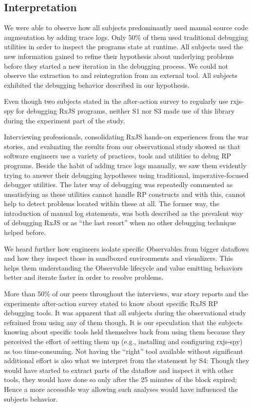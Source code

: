 \documentclass[sigplan,screen,review]{acmart}
\begin{document}
\subsection{Interpretation}

We were able to observe how all subjects predominantly used manual source code augmentation by adding trace logs. Only 50\% of them used traditional debugging utilities in order to inspect the programs state at runtime. All subjects used the new information gained to refine their hypothesis about underlying problems before they started a new iteration in the debugging process. We could not observe the extraction to and reintegration from an external tool. All subjects exhibited the debugging behavior described in our hypothesis.

Even though two subjects stated in the after-action survey to regularly use rxjs-spy for debugging RxJS programs, neither S1 nor S3 made use of this library during the experiment part of the study.

Interviewing professionals, consolidating RxJS hands-on experiences from the war stories, and evaluating the results from our observational study showed us that software engineers use a variety of practices, tools and utilities to debug RP programs. Beside the habit of adding trace logs manually, we saw them evidently trying to answer their debugging hypotheses using traditional, imperative-focused debugger utilities. The later way of debugging was repeatedly commented as unsatisfying as these utilities cannot handle RP constructs and with this, cannot help to detect problems located within these at all. The former way, the introduction of manual log statements, was both described as the prevalent way of debugging RxJS or as ``the last resort'' when no other debugging technique helped before.

We heard further how engineers isolate specific Observables from bigger dataflows and how they inspect those in sandboxed environments and visualizers. This helps them understanding the Observable lifecycle and value emitting behaviors better and iterate faster in order to resolve problems.

More than 50\% of our peers throughout the interviews, war story reports and the experiments after-action survey stated to know about specific RxJS RP debugging tools. It was apparent that all subjects during the observational study refrained from using any of them though. It is our speculation that the subjects knowing about specific tools held themselves back from using them because they perceived the effort of setting them up (e.g., installing and configuring rxjs-spy) as too time-consuming. Not having the ``right'' tool available without significant additional effort is also what we interpret from the statement by S4: Though they would have started to extract parts of the dataflow and inspect it with other tools, they would have done so only after the 25 minutes of the block expired; Hence a more accessible way allowing such analyses would have influenced the subjects behavior.
\end{document}
